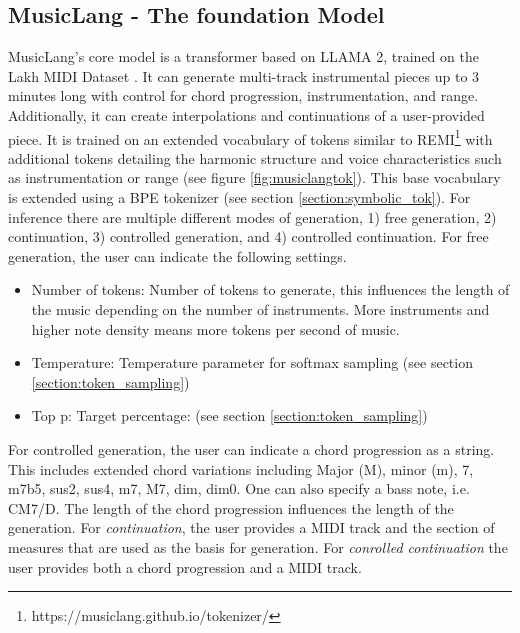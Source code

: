 \subsection{MusicLang - The foundation Model}
MusicLang's core model is a transformer based on LLAMA 2, trained on the Lakh MIDI Dataset \cite{Raffel_2016}. It can generate multi-track instrumental pieces up to 3 minutes long with control for chord progression, instrumentation, and range. Additionally, it can create interpolations and continuations of a user-provided piece. It is trained on an extended vocabulary of tokens similar to REMI\footnote{https://musiclang.github.io/tokenizer/} with additional tokens detailing the harmonic structure and voice characteristics such as instrumentation or range (see figure \ref{fig:musiclangtok}). This base vocabulary is extended using a BPE tokenizer (see section \ref{section:symbolic_tok}). 
For inference there are multiple different modes of generation, 1) free generation, 2) continuation, 3) controlled generation, and 4) controlled continuation. For free generation, the user can indicate the following settings.
\begin{itemize}
\item Number of tokens: Number of tokens to generate, this influences the length of the music depending on the number of instruments. More instruments and higher note density means more tokens per second of music.
\item Temperature: Temperature parameter for softmax sampling (see section \ref{section:token_sampling})
\item Top p: Target percentage: (see section \ref{section:token_sampling}) 
\end{itemize}
For controlled generation, the user can indicate a chord progression as a string. This includes extended chord variations including Major (M), minor (m), 7, m7b5, sus2, sus4, m7, M7, dim, dim0. One can also specify a bass note, i.e. CM7/D. The length of the chord progression influences the length of the generation.
For \textit{continuation}, the user provides a MIDI track and the section of measures that are used as the basis for generation.
For \textit{conrolled continuation} the user provides both a chord progression and a MIDI track. 

